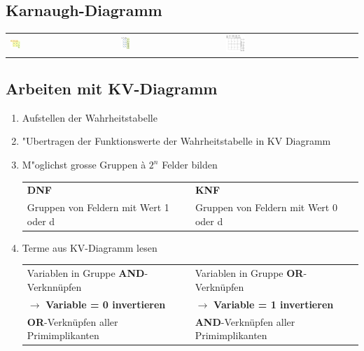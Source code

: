 \subsection{Karnaugh-Diagramm}
\begin{tabular}{lll}
	\includegraphics[width=0.1\textwidth]{pics/kv/2erKV} & 
	\includegraphics[width=0.1\textwidth]{pics/kv/3erKV} &
	\includegraphics[width=0.15\textwidth]{pics/kv/4erKV}\\
\end{tabular}
\subsection{Arbeiten mit KV-Diagramm}
\begin{enumerate}
\setlength{\itemsep}{1pt}
  \setlength{\parskip}{0pt}
  \setlength{\parsep}{0pt}
\item Aufstellen der Wahrheitstabelle\\
\item "Ubertragen der Funktionswerte der Wahrheitstabelle in KV Diagramm\\
\item M"oglichst grosse Gruppen à $2^n$ Felder bilden\\
\begin{tabular}{|p{7cm}|p{7cm}}
	\textbf{DNF} & \textbf{KNF} \\
	Gruppen von Feldern mit Wert 1 oder d & Gruppen von Feldern mit Wert 0 oder d\\
\end{tabular}
\item Terme aus KV-Diagramm lesen\\
\begin{tabular}{|p{7cm}|p{7cm}}
	Variablen in Gruppe \textbf{AND}-Verknnüpfen & Variablen in Gruppe \textbf{OR}-Verknüpfen\\
	$\rightarrow$ \textbf{Variable = 0 invertieren}&$\rightarrow$ \textbf{Variable = 1 invertieren}\\
	\textbf{OR}-Verknüpfen aller Primimplikanten & \textbf{AND}-Verknüpfen aller Primimplikanten\\
\end{tabular}
\end{enumerate}